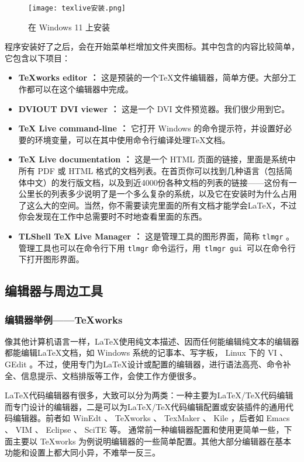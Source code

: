 \begin{figure}[H]
    \centering
    \texttt{[image: texlive安装.png]}
    \caption{在 Windows 11 上安装 }
    \label{fig:1}
\end{figure}

程序安装好了之后，会在开始菜单栏增加\texlive 文件夹图标。其中包含的内容比较简单，它包含以下项目：

\begin{itemize}
    \item \textbf{TeXworks editor ：} 这是\texlive 预装的一个\TeX 文件编辑器，简单方便。大部分工作都可以在这个编辑器中完成。
    \item \textbf{DVIOUT DVI viewer ：} 这是一个 DVI 文件预览器。我们很少用到它。
    \item \textbf{TeX Live command-line ：} 它打开 Windows 的命令提示符，并设置好必要的环境变量，可以在其中使用命令行编译处理\TeX 文档。
    \item \textbf{TeX Live documentation ：} 这是一个 HTML 页面的链接，里面是\texlive 系统中所有 PDF 或 HTML 格式的文档列表。在首页你可以找到几种语言（包括简体中文）的\texlive 发行版文档，以及到近4000份各种文档的列表的链接——这份有一公里长的列表多少说明了\texlive 是一个多么复杂的系统，以及它在安装时为什么占用了这么大的空间。当然，你不需要读完里面的所有文档才能学会\LaTeX ，不过你会发现在工作中总需要时不时地查看里面的东西。
    \item \textbf{TLShell TeX Live Manager ：} 这是\texlive 管理工具的图形界面，简称 \lstinline{tlmgr} 。管理工具也可以在命令行下用 \lstinline{tlmgr} 命令运行，用\lstinline{ tlmgr gui }可以在命令行下打开图形界面。
\end{itemize}

\subsection{编辑器与周边工具}

\subsubsection{编辑器举例——TeXworks}

像其他计算机语言一样，\LaTeX 使用纯文本描述、因而任何能编辑纯文本的编辑器都能编辑\LaTeX 文档，如 Windows 系统的记事本、写字板， Linux 下的 VI 、 GEdit 。不过，使用专门为\LaTeX 设计或配置的编辑器，进行语法高亮、命令补全、信息提示、文档排版等工作，会使工作方便很多。

\LaTeX 代码编辑器有很多，大致可以分为两类：一种主要为\LaTeX/\TeX 代码编辑而专门设计的编辑器，二是可以为\LaTeX/\TeX 代码编辑配置或安装插件的通用代码编辑器。前者如 WinEdt 、 TeXworks 、 TexMaker 、 Kile ，后者如 Emacs 、 VIM 、 Eclipse 、 SciTE 等。 通常前一种编辑器配置和使用更简单一些，下面主要以 TeXworks 为例说明编辑器的一些简单配置。其他大部分编辑器在基本功能和设置上都大同小异，不难举一反三。

